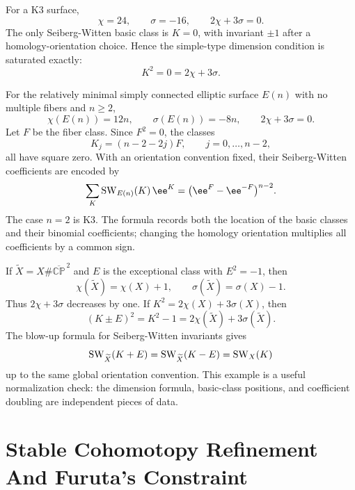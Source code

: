 \begin{example}
\label{ex:sw-basic-classes-k3-elliptic-blowup}
For a K3 surface,
\[
  \chi=24,\qquad \sigma=-16,\qquad 2\chi+3\sigma=0.
\]
The only Seiberg-Witten basic class is \(K=0\), with invariant \(\pm1\) after
a homology-orientation choice.  Hence the simple-type dimension condition is
saturated exactly:
\[
  K^2=0=2\chi+3\sigma.
\]

For the relatively minimal simply connected elliptic surface \(E(n)\) with
no multiple fibers and \(n\ge2\),
\[
  \chi(E(n))=12n,\qquad \sigma(E(n))=-8n,
  \qquad 2\chi+3\sigma=0.
\]
Let \(F\) be the fiber class.  Since \(F^2=0\), the classes
\begin{equation}
  K_j=(n-2-2j)F,\qquad j=0,\ldots,n-2,
  \label{eq:elliptic-basic-classes}
\end{equation}
all have square zero.  With an orientation convention fixed, their
Seiberg-Witten coefficients are encoded by
\begin{equation}
  \sum_K {\rm SW}_{E(n)}(K)\,\ee^{K}
  =
  \bigl(\ee^F-\ee^{-F}\bigr)^{n-2}.
  \label{eq:elliptic-sw-generating-function}
\end{equation}
The case \(n=2\) is K3.  The formula records both the location of the basic
classes and their binomial coefficients; changing the homology orientation
multiplies all coefficients by a common sign.

If \(\widetilde X=X\#\overline{\mathbb{CP}}^{\,2}\) and \(E\) is the
exceptional class with \(E^2=-1\), then
\[
  \chi(\widetilde X)=\chi(X)+1,
  \qquad
  \sigma(\widetilde X)=\sigma(X)-1.
\]
Thus \(2\chi+3\sigma\) decreases by one.  If \(K^2=2\chi(X)+3\sigma(X)\),
then
\begin{equation}
  (K\pm E)^2
  =
  K^2-1
  =
  2\chi(\widetilde X)+3\sigma(\widetilde X).
  \label{eq:blowup-simple-type-square}
\end{equation}
The blow-up formula for Seiberg-Witten invariants gives
\begin{equation}
  {\rm SW}_{\widetilde X}(K+E)
  =
  {\rm SW}_{\widetilde X}(K-E)
  =
  {\rm SW}_X(K)
  \label{eq:sw-blowup-basic-classes}
\end{equation}
up to the same global orientation convention.  This example is a useful
normalization check: the dimension formula, basic-class positions, and
coefficient doubling are independent pieces of data.
\end{example}

\section{Stable Cohomotopy Refinement And Furuta's Constraint}

